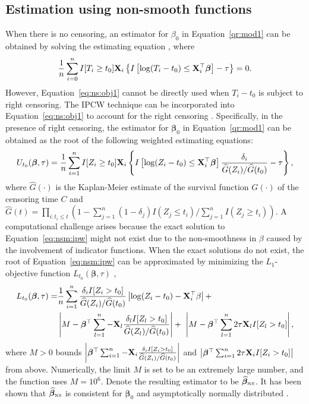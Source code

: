 \subsection{Estimation using non-smooth functions} \label{sec:nsm:pt}

When there is no censoring, an estimator for $\beta_0$ in Equation~\eqref{qr:mod1} 
can be obtained by solving the estimating equation \citep{kim2012censored}, where
\begin{equation} \label{eq:ns:obj1}
  \frac{1}{n}\sum_{i=0}^{n}I[T_i \ge t_0] \mathbf{X}_i \left\{I\left[\log(T_i - t_0) \leq \mathbf{X}_i^{\top}\bm{\beta} \right] - \tau \right\} = 0.
\end{equation}
However, Equation~\eqref{eq:ns:obj1}  cannot be directly used when $T_i - t_0$ is subject to right censoring. 
The IPCW technique can be incorporated into Equation~\eqref{eq:ns:obj1} 
to account for the right censoring \citep{li2016quantile}. 
Specifically, in the presence of right censoring, 
the estimator for $\bm{\beta}_0$ in Equation~\eqref{qr:mod1} can be obtained as the root of the following weighted estimating equations:
\begin{equation} \label{eq:nsm:ipw}
  U_{t_0}(\bm{\beta}, \tau) = \frac{1}{n}\sum_{i=1}^{n}I[Z_i \ge t_0] \mathbf{X}_i  \left\{I \left[\log(Z_i - t_0) \leq \mathbf{X}_i^{\top} \bm{\beta} \right]\frac{\delta_i}{\widehat{G}(Z_i)/\widehat{G}(t_0)}  -\tau \right\},
\end{equation}
where $\widehat{G}(\cdot)$ 
is the Kaplan-Meier estimate of the survival function $G(\cdot)$ of the censoring time $C$ and 
$\widehat{G}(t) = \prod_{i: t_i \leq t} (1 - \sum_{j=1}^n (1 - \delta_j)I(Z_j \leq t_i) / \sum_{j=1}^n I(Z_j \geq t_i))$.
A computational challenge arises because the exact solution to Equation~\eqref{eq:nsm:ipw} might not exist 
due to the non-smoothness in $\beta$ caused by the involvement of indicator functions.
When the exact solutions do not exist, the root of Equation~\eqref{eq:nsm:ipw} can be approximated by 
minimizing the $L_1$-objective function $L_{t_0}(\bm{\beta}, \tau)$ \citep{li2016quantile},
\begin{align*} 
  \label{l1:nsm}
  \nonumber
  L_{t_0}(\bm{\beta}, \tau) = & \frac{1}{n}\sum_{i=1}^n \frac{\delta_i I[Z_i > t_0]}{\widehat{G}(Z_i)/\widehat{G}(t_0)} \left| \log(Z_i - t_0) - \mathbf{X}_i^{\top}\beta \right| + \\
                              & \left| M - \bm{\beta}^{\top}\sum_{l=1}^n - \mathbf{X}_l \frac{\delta_l I[Z_l > t_0]}{\widehat{G}(Z_l)/\widehat{G}(t_0)}\right| 
                                + \ \left| M - \bm{\beta}^{\top}\sum_{l=1}^n 2\tau \mathbf{X}_l I[Z_l > t_0]\right|,
\end{align*} 
where $M > 0$ bounds 
$\left| \bm{\beta}^{\top}\sum_{i=1}^n - \mathbf{X}_i \frac{\delta_i I[Z_i > t_0]}{\widehat{G}(Z_i)/ \widehat{G}(t_0)}\right|$ 
and $\left| \bm{\beta}^{\top}\sum_{i=1}^n 2\tau \mathbf{X}_i I[Z_i > t_0]\right|$ from above. 
Numerically, the limit $M$ is set to be an extremely large number, and the  function uses $M = 10^6$.
Denote the resulting estimator to be $\widehat{\bm{\beta}}_{\tiny\mbox{NS}}$. 
It has been shown that $\widehat{\bm{\beta}}_{\tiny\mbox{NS}}$ is consistent for $\bm{\beta}_0$ and asymptotically normally distributed 
\citep{li2016quantile}. 

